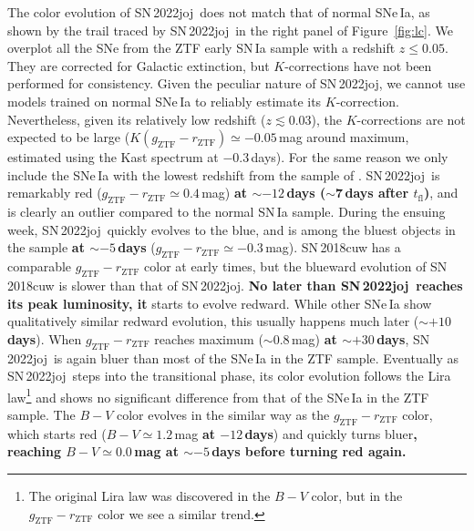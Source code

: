 \documentclass[twocolumn]{aastex631}
\newcommand{\sn}{SN\,2022joj}
\newcommand{\rev}[1]{\textbf{#1}}
\begin{document}
\begin{CJK*}{UTF8}{gbsn}
The color evolution of \sn\ does not match that of normal SNe\,Ia, as shown by the trail traced by \sn\ in the right panel of Figure~\ref{fig:lc}. We overplot all the SNe from the ZTF early SN\,Ia sample \citep{Bulla2020} with a redshift $z\le0.05$. They are corrected for Galactic extinction, but $K$-corrections have not been performed for consistency. Given the peculiar nature of \sn, we cannot use models trained on normal SNe\,Ia to reliably estimate its $K$-correction. Nevertheless, given its relatively low redshift ($z\lesssim0.03$), the $K$-corrections are not expected to be large ($K(g_\mathrm{ZTF}-r_\mathrm{ZTF})\simeq-0.05$\,mag around maximum, estimated using the Kast spectrum at $-0.3$\,days). For the same reason we only include the SNe\,Ia with the lowest redshift from the sample of \citet{Bulla2020}. 
\sn\ is remarkably red ($g_\mathrm{ZTF} - r_\mathrm{ZTF}\simeq0.4$\,mag) \rev{at $\sim$$-12$\,days ($\sim$7\,days after $t_\mathrm{fl}$)}, and is clearly an outlier compared to the normal SN\,Ia sample.%
During the ensuing week, \sn\ quickly evolves to the blue, and is among the bluest objects in the sample \rev{at $\sim$$-5$\,days} ($g_\mathrm{ZTF} - r_\mathrm{ZTF}\simeq -0.3$\,mag). SN\,2018cuw has a comparable $g_\mathrm{ZTF} - r_\mathrm{ZTF}$ color at early times, but the blueward evolution of SN\,2018cuw is slower than that of \sn. 
\rev{No later than \sn\ reaches its peak luminosity, it} starts to evolve redward. While other SNe\,Ia show qualitatively similar redward evolution, this usually happens much later (\rev{$\sim$$+10$\,days}). 
When $g_\mathrm{ZTF} - r_\mathrm{ZTF}$ reaches maximum ($\sim$0.8\,mag) \rev{at $\sim$$+30$\,days}, \sn\ is again bluer than most of the SNe\,Ia in the ZTF sample. 
Eventually as \sn\ steps into the transitional phase, its color evolution follows the Lira law\footnote{The original Lira law was discovered in the $B-V$ color, but in the $g_\mathrm{ZTF}-r_\mathrm{ZTF}$ color we see a similar trend.} \citep{Lira_1996,Phillips_1999} and shows no significant difference from that of the SNe\,Ia in the ZTF sample.
The $B-V$ color evolves in the similar way as the $g_\mathrm{ZTF}-r_\mathrm{ZTF}$ color, which starts red ($B-V\simeq1.2$\,mag \rev{at $-12$\,days}) and quickly turns bluer\rev{, reaching $B-V\simeq0.0$\,mag at $\sim$$-5$\,days before turning red again.}


\end{CJK*}
\end{document}
